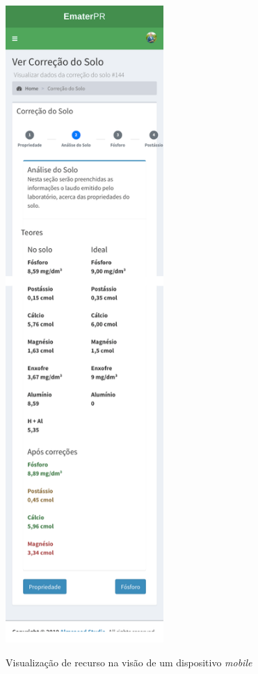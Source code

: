 \begin{figure}[H]
    \centering
    \caption{Visualização de recurso na visão de um dispositivo \textit{mobile}}
    \includegraphics[width=6cm]{./dados/figuras/prototipos/show_mobile.png}
    \label{fig:prototipo_show_mobile}
\end{figure}